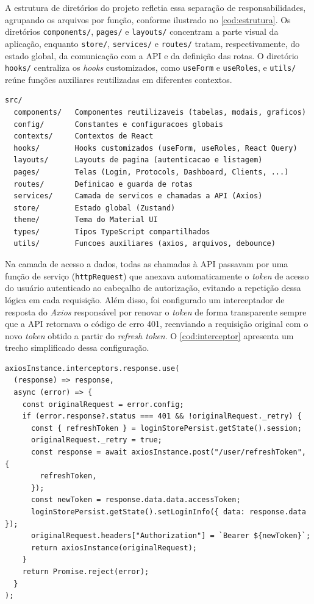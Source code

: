 A estrutura de diretórios do projeto refletia essa separação de responsabilidades, agrupando os arquivos por função, conforme ilustrado no \autoref{cod:estrutura}. Os diretórios \texttt{components/}, \texttt{pages/} e \texttt{layouts/} concentram a parte visual da aplicação, enquanto \texttt{store/}, \texttt{services/} e \texttt{routes/} tratam, respectivamente, do estado global, da comunicação com a API e da definição das rotas. O diretório \texttt{hooks/} centraliza os \textit{hooks} customizados, como \texttt{useForm} e \texttt{useRoles}, e \texttt{utils/} reúne funções auxiliares reutilizadas em diferentes contextos.

\begin{lstlisting}[caption={Organização simplificada dos diretórios do projeto.}, label={cod:estrutura}, numbers=none]
src/
  components/   Componentes reutilizaveis (tabelas, modais, graficos)
  config/       Constantes e configuracoes globais
  contexts/     Contextos de React
  hooks/        Hooks customizados (useForm, useRoles, React Query)
  layouts/      Layouts de pagina (autenticacao e listagem)
  pages/        Telas (Login, Protocols, Dashboard, Clients, ...)
  routes/       Definicao e guarda de rotas
  services/     Camada de servicos e chamadas a API (Axios)
  store/        Estado global (Zustand)
  theme/        Tema do Material UI
  types/        Tipos TypeScript compartilhados
  utils/        Funcoes auxiliares (axios, arquivos, debounce)
\end{lstlisting}

Na camada de acesso a dados, todas as chamadas à API passavam por uma função de serviço (\texttt{httpRequest}) que anexava automaticamente o \textit{token} de acesso do usuário autenticado ao cabeçalho de autorização, evitando a repetição dessa lógica em cada requisição. Além disso, foi configurado um interceptador de resposta do \textit{Axios} responsável por renovar o \textit{token} de forma transparente sempre que a API retornava o código de erro 401, reenviando a requisição original com o novo \textit{token} obtido a partir do \textit{refresh token}. O \autoref{cod:interceptor} apresenta um trecho simplificado dessa configuração.

\begin{lstlisting}[caption={Trecho do interceptador de resposta para renovação do \textit{token} (\textit{refresh token}).}, label={cod:interceptor}]
axiosInstance.interceptors.response.use(
  (response) => response,
  async (error) => {
    const originalRequest = error.config;
    if (error.response?.status === 401 && !originalRequest._retry) {
      const { refreshToken } = loginStorePersist.getState().session;
      originalRequest._retry = true;
      const response = await axiosInstance.post("/user/refreshToken", {
        refreshToken,
      });
      const newToken = response.data.data.accessToken;
      loginStorePersist.getState().setLoginInfo({ data: response.data });
      originalRequest.headers["Authorization"] = `Bearer ${newToken}`;
      return axiosInstance(originalRequest);
    }
    return Promise.reject(error);
  }
);
\end{lstlisting}

